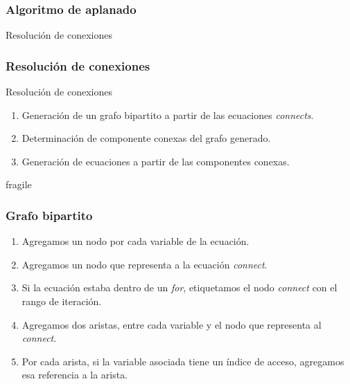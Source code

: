 \begin{frame}[fragile]
\frametitle{Algoritmo de aplanado} 
\begin{center}
\huge Resolución de conexiones
\end{center}
\end{frame}



\begin{frame}[fragile]
\frametitle{Resolución de conexiones} 
\begin{block}{Resolución de conexiones}
\begin{enumerate}
\item Generación de un grafo bipartito a partir de las ecuaciones \textit{connects}.
\item Determinación de componente conexas del grafo generado.
\item Generación de ecuaciones a partir de las componentes conexas.
\end{enumerate}
\end{block}
\end{frame}

\begin{frame}{fragile}
\frametitle{Grafo bipartito}
\begin{enumerate}
\setlength\itemsep{1em}
\item Agregamos un nodo por cada variable de la ecuación.
\item Agregamos un nodo que representa a la ecuación \textit{connect}.
\item Si la ecuación estaba dentro de un \textit{for}, etiquetamos el nodo \textit{connect} con el rango de iteraci\'on. 
\item Agregamos dos aristas, entre cada variable y el nodo que representa al \textit{connect}.
\item Por cada arista, si la variable asociada tiene un índice de acceso, agregamos esa referencia a la arista. 
\end{enumerate}
\end{frame}

